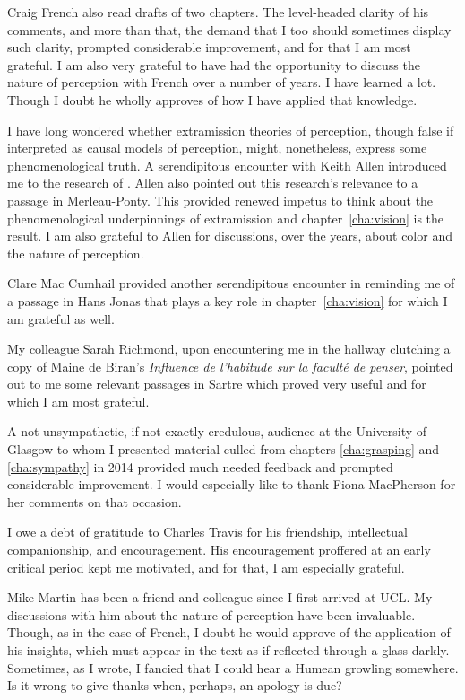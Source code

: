 Craig French also read drafts of two chapters. The level-headed clarity of his comments, and more than that, the demand that I too should sometimes display such clarity, prompted considerable improvement, and for that I am most grateful. I am also very grateful to have had the opportunity to discuss the nature of perception with French over a number of years. I have learned a lot. Though I doubt he wholly approves of how I have applied that knowledge.

I have long wondered whether extramission theories of perception, though false if interpreted as causal models of perception, might, nonetheless, express some phenomenological truth. A serendipitous encounter with Keith Allen introduced me to the research of \citet{Winer:1996as}. Allen also pointed out this research's relevance to a passage in Merleau-Ponty. This provided renewed impetus to think about the phenomenological underpinnings of extramission and chapter~\ref{cha:vision} is the result. I am also grateful to Allen for discussions, over the years, about color and the nature of perception.

Clare Mac Cumhail provided another serendipitous encounter in reminding me of a passage in Hans Jonas that plays a key role in chapter~\ref{cha:vision} for which I am grateful as well.

My colleague Sarah Richmond, upon encountering me in the hallway clutching a copy of Maine de Biran's \emph{Influence de l'habitude sur la facult\'{e} de penser}, pointed out to me some relevant passages in Sartre which proved very useful and for which I am most grateful.

A not unsympathetic, if not exactly credulous, audience at the University of Glasgow to whom I presented material culled from chapters \ref{cha:grasping} and \ref{cha:sympathy} in 2014 provided much needed feedback and prompted considerable improvement. I would especially like to thank Fiona MacPherson for her comments on that occasion.

I owe a debt of gratitude to Charles Travis for his friendship, intellectual companionship, and encouragement. His encouragement proffered at an early critical period kept me motivated, and for that, I am especially grateful.

Mike Martin has been a friend and colleague since I first arrived at UCL. My discussions with him about the nature of perception have been invaluable. Though, as in the case of French, I doubt he would approve of the application of his insights, which must appear in the text as if reflected through a glass darkly. Sometimes, as I wrote, I fancied that I could hear a Humean growling somewhere. Is it wrong to give thanks when, perhaps, an apology is due?

